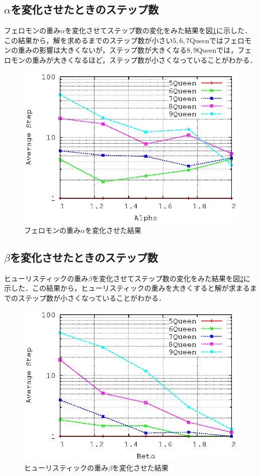 \documentclass{jarticle}
\begin{document}
\subsection{$\alpha$を変化させたときのステップ数}
フェロモンの重み$\alpha$を変化させてステップ数の変化をみた結果を図\ref{fig:alpha}に示した．この結果から，解を求めるまでのステップ数が小さい$5,6,7$Queenではフェロモンの重みの影響は大きくないが，ステップ数が大きくなる$8,9$Queenでは，フェロモンの重みが大きくなるほど，ステップ数が小さくなっていることがわかる．
\begin{figure}[H]
\begin{center}
	\includegraphics[width=120mm]{image/alpha.eps}
	\caption{フェロモンの重み$\alpha$を変化させた結果}
	\label{fig:alpha}
\end{center}
\end{figure}


\subsection{$\beta$を変化させたときのステップ数}
ヒューリスティックの重み$\beta$を変化させてステップ数の変化をみた結果を図\ref{fig:beta}に示した．この結果から，ヒューリスティックの重みを大きくすると解が求まるまでのステップ数が小さくなっていることがわかる．
\begin{figure}[H]
\begin{center}
	\includegraphics[width=120mm]{image/beta.eps}
	\caption{ヒューリスティックの重み$\beta$を変化させた結果}
	\label{fig:beta}
\end{center}
\end{figure}
\end{document}
